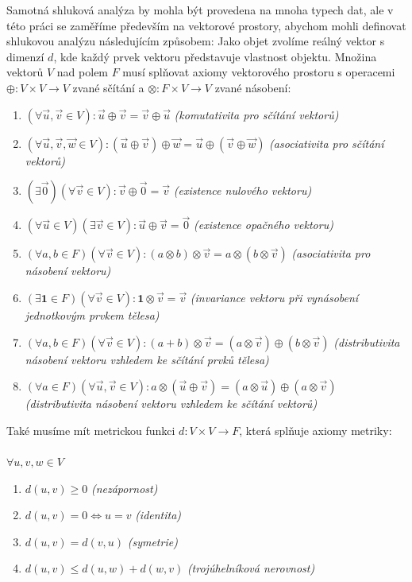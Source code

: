 Samotná shluková analýza by mohla být provedena na mnoha typech dat, ale v této práci se zaměříme především na vektorové prostory, abychom mohli definovat shlukovou analýzu následujícím způsobem: Jako objet zvolíme reálný vektor s dimenzí $d$, kde každý prvek vektoru představuje vlastnost objektu. Množina vektorů $V$ nad polem $F$ musí splňovat axiomy vektorového prostoru s operacemi $\oplus: V \times V \to V$ zvané sčítání a $\otimes:F \times V \to V$ zvané násobení:
\begin{enumerate}
\item $(\forall \vec{u}, \vec{v} \in V):\vec{u} \oplus \vec{v} = \vec{v} \oplus \vec{u}$ \textit{(komutativita pro sčítání vektorů)}
\item $(\forall \vec{u}, \vec{v}, \vec{w} \in V):(\vec{u} \oplus \vec{v}) \oplus \vec{w} = \vec{u} \oplus (\vec{v} \oplus \vec{w})$ \textit{(asociativita pro sčítání vektorů)}
\item $(\exists \vec{0})(\forall \vec{v} \in V):\vec{v} \oplus \vec{0} = \vec{v}$ \textit{(existence nulového vektoru)}
\item $(\forall \vec{u} \in V)(\exists \vec{v} \in V):\vec{u} \oplus \vec{v} = \vec{0}$ \textit{(existence opačného vektoru)}
\item $(\forall a,b \in F)(\forall \vec{v} \in V):(a \otimes b) \otimes \vec{v} = a \otimes (b \otimes \vec{v})$ \textit{(asociativita pro násobení vektoru)}
\item $(\exists \textbf{1} \in F)(\forall \vec{v} \in V):\textbf{1} \otimes \vec{v} = \vec{v}$ \textit{(invariance vektoru při vynásobení jednotkovým prvkem tělesa)}
\item $(\forall a,b \in F)(\forall \vec{v} \in V):(a + b) \otimes \vec{v} = (a \otimes \vec{v}) \oplus (b \otimes \vec{v})$ \textit{(distributivita násobení vektoru vzhledem ke sčítání prvků tělesa)}
\item $(\forall a \in F)(\forall \vec{u}, \vec{v} \in V):a \otimes (\vec{u} \oplus \vec{v}) = (a \otimes \vec{u}) \oplus (a \otimes \vec{v})$ \textit{(distributivita násobení vektoru vzhledem ke sčítání vektorů)}
\end{enumerate}

Také musíme mít metrickou funkci $d:V \times V \to F$, která splňuje axiomy metriky:\\ \\
$ \forall  u, v, w \in V$
\begin{enumerate}
\item $d(u, v)\geq 0$ \textit{(nezápornost)}
\item $d(u, v) = 0 \iff u = v$ \textit{(identita)}
\item $d(u, v) = d(v, u)$ \textit{(symetrie)}
\item$d(u, v) \leq d(u, w) + d(w, v)$ \textit{(trojúhelníková nerovnost)}
\end{enumerate}

